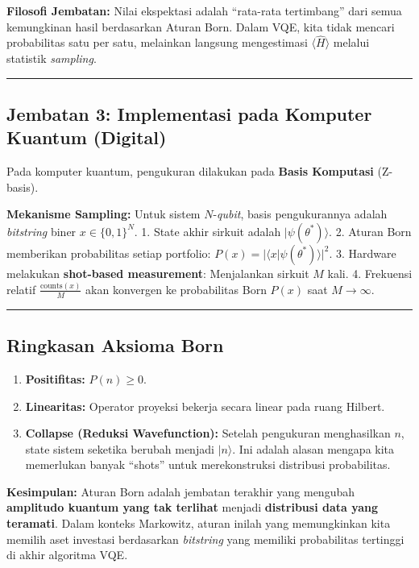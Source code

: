 \textbf{Filosofi Jembatan:} Nilai ekspektasi adalah ``rata-rata tertimbang'' dari semua kemungkinan hasil berdasarkan Aturan Born. Dalam VQE, kita tidak mencari probabilitas satu per satu, melainkan langsung mengestimasi \(\langle \hat{H} \rangle\) melalui statistik \emph{sampling}.

\begin{center}\rule{0.5\linewidth}{0.5pt}\end{center}

\hypertarget{jembatan-3-implementasi-pada-komputer-kuantum-digital}{%
\subsection{Jembatan 3: Implementasi pada Komputer Kuantum (Digital)}\label{jembatan-3-implementasi-pada-komputer-kuantum-digital}}

Pada komputer kuantum, pengukuran dilakukan pada \textbf{Basis Komputasi} (Z-basis).

\textbf{Mekanisme Sampling:} Untuk sistem \(N\)-\emph{qubit}, basis pengukurannya adalah \emph{bitstring} biner \(x \in \{0, 1\}^N\). 1. State akhir sirkuit adalah \(|\psi(\theta^*)\rangle\). 2. Aturan Born memberikan probabilitas setiap portfolio: \(P(x) = |\langle x | \psi(\theta^*) \rangle|^2\). 3. Hardware melakukan \textbf{shot-based measurement}: Menjalankan sirkuit \(M\) kali. 4. Frekuensi relatif \(\frac{\text{counts}(x)}{M}\) akan konvergen ke probabilitas Born \(P(x)\) saat \(M \to \infty\).

\begin{center}\rule{0.5\linewidth}{0.5pt}\end{center}

\hypertarget{ringkasan-aksioma-born}{%
\subsection{Ringkasan Aksioma Born}\label{ringkasan-aksioma-born}}

\begin{enumerate}
\def\labelenumi{\arabic{enumi}.}
\tightlist
\item
  \textbf{Positifitas:} \(P(n) \ge 0\).
\item
  \textbf{Linearitas:} Operator proyeksi bekerja secara linear pada ruang Hilbert.
\item
  \textbf{Collapse (Reduksi Wavefunction):} Setelah pengukuran menghasilkan \(n\), state sistem seketika berubah menjadi \(|n\rangle\). Ini adalah alasan mengapa kita memerlukan banyak ``shots'' untuk merekonstruksi distribusi probabilitas.
\end{enumerate}

\textbf{Kesimpulan:} Aturan Born adalah jembatan terakhir yang mengubah \textbf{amplitudo kuantum yang tak terlihat} menjadi \textbf{distribusi data yang teramati}. Dalam konteks Markowitz, aturan inilah yang memungkinkan kita memilih aset investasi berdasarkan \emph{bitstring} yang memiliki probabilitas tertinggi di akhir algoritma VQE.
